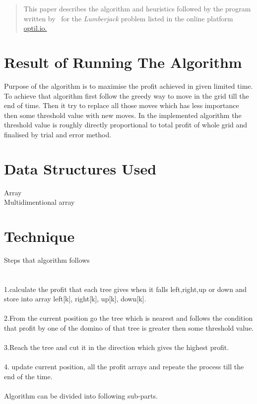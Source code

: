\documentclass[12pt]{article}
\begin{document}
\maketitle

\begin{abstract}
This paper describes the algorithm and heuristics followed by the program written by \myteam\ for the 
\textit{Lumberjack} problem listed in the online platform 
\href{https://www.optil.io/optilion}{optil.io.} 
\end{abstract}

\section{Result of Running The Algorithm}
Purpose of the algorithm is to maximise the profit achieved in given limited time. To achieve that algorithm first follow the greedy way to move in the grid till the end of time. Then it try to replace all those moves which has less importance then some threshold value with new moves. 
In the implemented algorithm the threshold value is roughly directly proportional to total profit of whole grid and finalised by trial and error method.
\section{Data Structures Used}
Array\\
Multidimentional array

\section{Technique}
Steps that algorithm follows\\ \\ \\
1.calculate the profit that each tree gives when it falls left,right,up or down and store into array left[k], right[k], up[k], down[k].\\ \\
2.From the current position go the tree which is nearest and follows the condition that profit by one of the domino of that tree is greater then some threshold value.\\ \\
3.Reach the tree and cut it in the direction which gives the highest profit.\\ \\
4. update current position, all the profit arrays and repeate the process till the end of the time.\\ \\
Algorithm can be divided into following sub-parts.
\\
\end{document}
